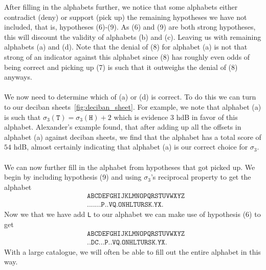   \noindent  After filling in the alphabets further, we notice that
  some alphabets either contradict (deny) or support (pick up) the
  remaining hypotheses we have not included, that is, hypotheses
  (6)-(9). As (6) and (9) are both strong hypotheses, this will
  discount the validity of alphabets (b) and (c). Leaving us with
  remaining alphabets (a) and (d). Note that the denial of (8) for
  alphabet (a) is not that strong of an indicator against this
  alphabet since (8) has roughly even odds of being correct and
  picking up (7) is such that it outweighs the denial of (8) anyways.
  \\\\We now need to determine which of (a) or (d) is correct. To do
  this we can turn to our deciban sheets~\ref{fig:deciban_sheet}. For
  example, we note that alphabet (a) is such that $\sigma_3(\texttt{T}) =
  \sigma_3(\texttt{H}) + 2$ which is evidence $3$ hdB in favor of this
  alphabet. Alexander's example found, that after adding up all the
  offsets in alphabet (a) against deciban sheets, we find that the
  alphabet has a total score of $54$ hdB, almost certainly indicating
  that alphabet (a) is our correct choice for $\sigma_3$.
  \\\\We can now further fill in the alphabet from hypotheses that
  got picked up. We begin by including hypothesis (9) and using
  $\sigma_3$'s reciprocal property to get the alphabet
  \begin{align*}
    & \texttt{ABCDEFGHIJKLMNOPQRSTUVWXYZ} \\
    & \texttt{.......P..VQ.ONHLTURSK.YX.}
  \end{align*}
  Now we that we have add \texttt{L} to our alphabet we can make use
  of hypothesis (6) to get
  \begin{align*}
    & \texttt{ABCDEFGHIJKLMNOPQRSTUVWXYZ} \\
    & \texttt{..DC...P..VQ.ONHLTURSK.YX.}
  \end{align*}
  With a large catalogue, we will often be able to fill out the
  entire alphabet in this way.

